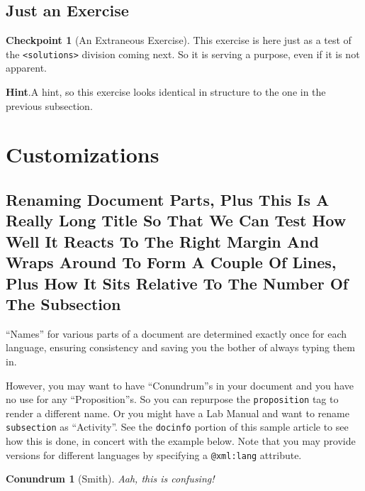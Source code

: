\documentclass{amsart}
\theoremstyle{plain}%
\newtheorem{proposition}[theorem]{Conundrum}
\theoremstyle{definition}%
\newtheorem{inlineexercise}[theorem]{Checkpoint}
\theoremstyle{remark}%
\newcommand{\blocktitlefont}{\relax}
\newcommand{\mono}[1]{\texttt{#1}}
\numberwithin{equation}{section}
\begin{document}
\subsection{Just an Exercise}\label{section-advanced-numbering-12}%
\begin{inlineexercise}[An Extraneous Exercise]\label{section-advanced-numbering-12-2}%
%
This exercise is here just as a test of the \mono{<solutions>} division coming next.  So it is serving a purpose, even if it is not apparent.%
\par\smallskip%
\noindent\textbf{\blocktitlefont Hint}.\hypertarget{section-advanced-numbering-12-2-3}{}\quad{}A hint, so this exercise looks identical in structure to the one in the previous subsection.%
\end{inlineexercise}%
%
%
\typeout{************************************************}
\typeout{************************************************}
%
\section{Customizations}\label{section-customizations}%
%
%
\typeout{************************************************}
\typeout{************************************************}
%
\subsection{Renaming Document Parts, Plus This Is A Really Long Title So That We Can Test How Well It Reacts To The Right Margin And Wraps Around To Form A Couple Of Lines, Plus How It Sits Relative To The Number Of The Subsection}\label{rename-facility}%
``Names'' for various parts of a document are determined exactly once for each language, ensuring consistency and saving you the bother of always typing them in.%
\par
However, you may want to have ``Conundrum''s in your document and you have no use for any ``Proposition''s.  So you can repurpose the \mono{proposition} tag to render a different name.  Or you might have a Lab Manual and want to rename \mono{subsection} as ``Activity''.  See the \mono{docinfo} portion of this sample article to see how this is done, in concert with the example below.  Note that you may provide versions for different languages by specifying a \mono{@xml:lang} attribute.%
\begin{proposition}[Smith]\label{proposition-as-conundrum}%
%
Aah, this \emph{is} confusing!%
\end{proposition}
\end{document}
